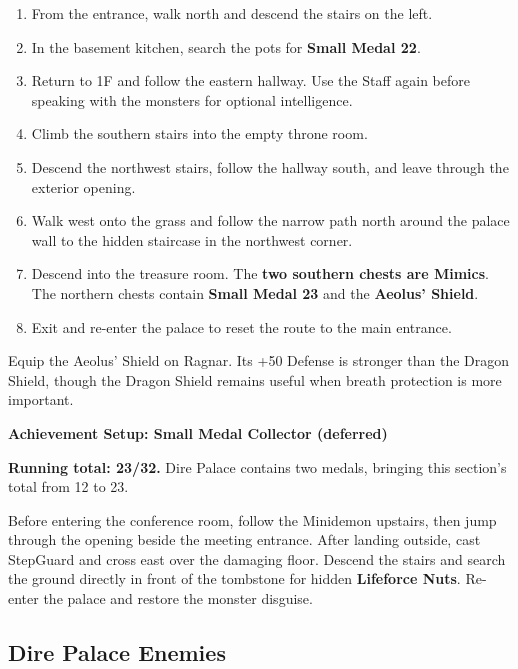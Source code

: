 \documentclass[
  american,
  10pt,
  letterpaper,
  oneside,
  open=any]{scrreprt}
\providecommand{\tightlist}{%
  \setlength{\itemsep}{0pt}\setlength{\parskip}{0pt}}
\begin{document}
\begin{enumerate}
\def\labelenumi{\arabic{enumi}.}
\tightlist
\item
  From the entrance, walk north and descend the stairs on the left.
\item
  In the basement kitchen, search the pots for \textbf{Small Medal 22}.
\item
  Return to 1F and follow the eastern hallway. Use the Staff again
  before speaking with the monsters for optional intelligence.
\item
  Climb the southern stairs into the empty throne room.
\item
  Descend the northwest stairs, follow the hallway south, and leave
  through the exterior opening.
\item
  Walk west onto the grass and follow the narrow path north around the
  palace wall to the hidden staircase in the northwest corner.
\item
  Descend into the treasure room. The \textbf{two southern chests are
  Mimics}. The northern chests contain \textbf{Small Medal 23} and the
  \textbf{Aeolus' Shield}.
\item
  Exit and re-enter the palace to reset the route to the main entrance.
\end{enumerate}

Equip the Aeolus' Shield on Ragnar. Its +50 Defense is stronger than the
Dragon Shield, though the Dragon Shield remains useful when breath
protection is more important.

\begin{achievementsetup}

\textbf{Achievement Setup: Small Medal Collector (deferred)}

\textbf{Running total: 23/32.} Dire Palace contains two medals, bringing
this section's total from 12 to 23.

\end{achievementsetup}

Before entering the conference room, follow the Minidemon upstairs, then
jump through the opening beside the meeting entrance. After landing
outside, cast StepGuard and cross east over the damaging floor. Descend
the stairs and search the ground directly in front of the tombstone for
hidden \textbf{Lifeforce Nuts}. Re-enter the palace and restore the
monster disguise.

\subsection{Dire Palace Enemies}\label{dire-palace-enemies}
\end{document}
